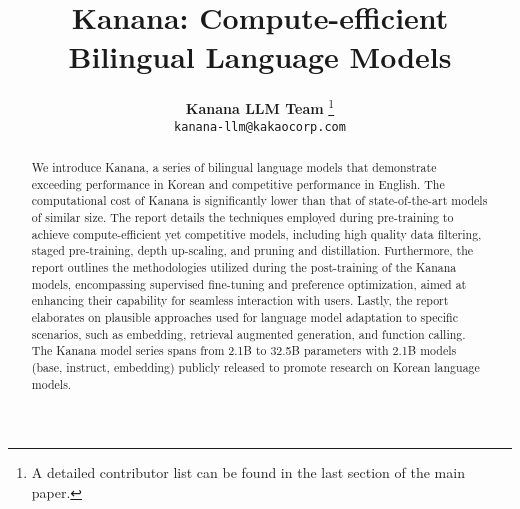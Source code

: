 \documentclass{article} %
\title{Kanana: Compute-efficient Bilingual Language Models}
\author{\textbf{Kanana LLM Team} \thanks{A detailed contributor list can be found in the last section of the main paper.} \\
\texttt{kanana-llm@kakaocorp.com} \\
}
\begin{document}
\ifcolmsubmission
\linenumbers
\fi

\maketitle


\begin{abstract}
We introduce Kanana, a series of bilingual language models that demonstrate exceeding performance in Korean and competitive performance in English. 
The computational cost of Kanana is significantly lower than that of state-of-the-art models of similar size.
The report details the techniques employed during pre-training to achieve compute-efficient yet competitive models, including high quality data filtering, staged pre-training, depth up-scaling, and pruning and distillation.
Furthermore, the report outlines the methodologies utilized during the post-training of the Kanana models, encompassing supervised fine-tuning and preference optimization, aimed at enhancing their capability for seamless interaction with users.
Lastly, the report elaborates on plausible approaches used for language model adaptation to specific scenarios, such as embedding, retrieval augmented generation, and function calling.
The Kanana model series spans from 2.1B to 32.5B parameters with 2.1B models (base, instruct, embedding) publicly released to promote research on Korean language models.
\end{abstract}














% 


\newpage
\begin{CJK}{UTF8}{mj}


\end{CJK}

\newpage
\appendix

\end{document}
